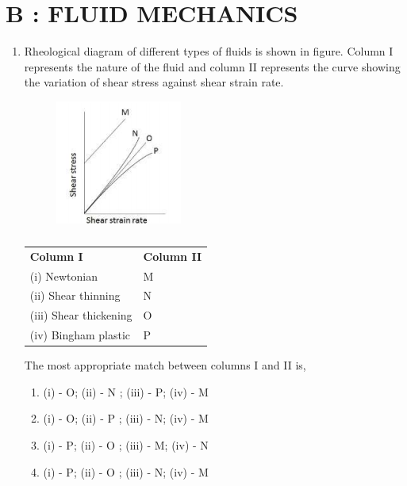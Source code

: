 \documentclass[a4paper,10pt]{article}
\begin{document}
\section*{B : FLUID MECHANICS}
\begin{enumerate}
    \item Rheological diagram of different types of fluids is shown in figure. Column I represents the nature of the fluid and column II represents the curve showing the variation of shear stress against shear strain rate.
    \begin{figure}[H]
        \centering
        \includegraphics[width=0.5\columnwidth]{q1_fluid_2018.png}
        \caption*{}
        \label{fig:q1_fluid_2018}
    \end{figure}
    \begin{table}[h!] \centering \caption*{} \label{tab:q1_fluid_2018}
        \begin{tabular}{ll}
            \textbf{Column I} & \textbf{Column II} \\
            (i) Newtonian & M \\
            (ii) Shear thinning & N \\
            (iii) Shear thickening & O \\
            (iv) Bingham plastic & P \\
        \end{tabular}
    \end{table}
    The most appropriate match between columns I and II is,
    \hfill{}
    \begin{enumerate}[label=\Alph*)]
        \item (i) - O; (ii) - N ; (iii) - P; (iv) - M
        \item (i) - O; (ii) - P ; (iii) - N; (iv) - M
        \item (i) - P; (ii) - O ; (iii) - M; (iv) - N
        \item (i) - P; (ii) - O ; (iii) - N; (iv) - M
    \end{enumerate}


\end{enumerate}
\end{document}
